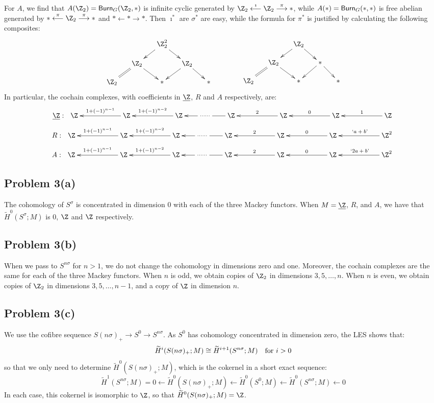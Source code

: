 \documentclass[11pt]{article}
\begin{document}
For $A$, we find that $A(\Z_2)=\Burnside_G(\Z_2,*)$ is infinite cyclic generated by $\Z_2\overset{\imath}{\longleftarrow}\Z_2\overset{\pi}{\longrightarrow}*$, while $A(*)=\operatorname{{\mathsf{Burn}}}_G(*,*)$ is free abelian generated by $*\overset{\pi}{\longleftarrow}\Z_2\overset{\pi}{\longrightarrow}*$ and $*\longleftarrow*\longrightarrow*$. Then $\imath^*$ are $\sigma^*$ are easy, while the formula for $\pi^*$ is justified by calculating the following composites:
\[\xymatrix@R=4mm@C=.5cm{
&&\Z_2^2\ar[dl]\ar[dr]\\
&\Z_2\ar@{=}[dl]\ar[dr]&&\Z_2\ar[dl]\ar[dr]\\
\Z_2&&\ast&&\ast
}\qquad\qquad
\xymatrix@R=4mm@C=.5cm{
&&\Z_2\ar[dl]\ar[dr]\\
&\Z_2\ar@{=}[dl]\ar[dr]&&\ast\ar[dl]\ar[dr]\\
\Z_2&&\ast&&\ast
}\]
In particular, the cochain complexes, with coefficients in $\underline\Z$, $R$ and $A$ respectively, are:
\[\underline\Z:\ \xymatrix@C=2cm{
\Z\ar[r];[]_{1+(-1)^{n-1}}&
\Z\ar[r];[]_{1+(-1)^{n-2}}&
\Z\ar[r];[]|{\ \cdots\cdots\ }&
\Z\ar[r];[]_{2}&
\Z\ar[r];[]_{0}&
\Z\ar[r];[]_1&
\Z
}\]
\[R:\ \xymatrix@C=2cm{
\Z\ar[r];[]_{1+(-1)^{n-1}}&
\Z\ar[r];[]_{1+(-1)^{n-2}}&
\Z\ar[r];[]|{\ \cdots\cdots\ }&
\Z\ar[r];[]_{2}&
\Z\ar[r];[]_{0}&
\Z\ar[r];[]_{\text{`$a+b$'}}&
\Z^2
}\]
\[A:\ \xymatrix@C=2cm{
\Z\ar[r];[]_{1+(-1)^{n-1}}&
\Z\ar[r];[]_{1+(-1)^{n-2}}&
\Z\ar[r];[]|{\ \cdots\cdots\ }&
\Z\ar[r];[]_{2}&
\Z\ar[r];[]_{0}&
\Z\ar[r];[]_{\text{`$2a+b$'}}&
\Z^2
}\]
\subsection*{Problem 3(a)}
The cohomology of $S^\sigma$ is concentrated in dimension 0 with each of the three Mackey functors.  When $M=\underline\Z$, $R$, and $A$, we have that $\widetilde H^0(S^\sigma;M)$ is $0$, $\Z$ and $\Z$ respectively.
\subsection*{Problem 3(b)}
When we pass to $S^{n\sigma}$ for $n>1$, we do not change the cohomology in dimensions zero and one. Moreover, the cochain complexes are the same for each of the three Mackey functors. When $n$ is odd, we obtain copies of $\Z_2$ in dimensions $3,5,\ldots,n$. When $n$ is even, we obtain copies of $\Z_2$ in dimensions $3,5,\ldots,n-1$, and a copy of $\Z$ in dimension $n$.
\subsection*{Problem 3(c)}
We use the cofibre sequence $S(n\sigma)_+\to S^0\to S^{n\sigma}$. As $S^0$ has cohomology concentrated in dimension zero, the LES shows that:
\[\widetilde H^i(S(n\sigma)_+;M)\cong \widetilde H^{i+1}(S^{n\sigma};M)\text{\quad for $i>0$}\]
so that we only need to determine $\widetilde H^0(S(n\sigma)_+;M)$, which is the cokernel in a short exact sequence:
\[\widetilde H^{1}(S^{n\sigma};M)=0\longleftarrow\widetilde H^{0}(S(n\sigma)_+;M)\longleftarrow\widetilde H^{0}(S^{0};M)\longleftarrow\widetilde H^{0}(S^{n\sigma};M)\longleftarrow0\]
In each case, this cokernel is isomorphic to $\Z$, so that $\widetilde H^0(S(n\sigma)_+;M)=\Z$.
\end{document}
